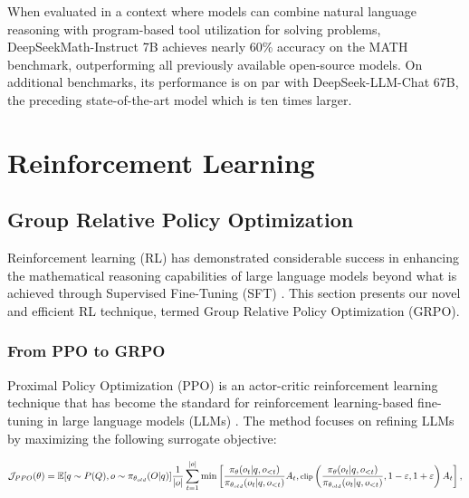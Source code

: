 \begin{itemize}[topsep=0pt]
\begin{itemize}[topsep=0pt]
When evaluated in a context where models can combine natural language reasoning with program-based tool utilization for solving problems, DeepSeekMath-Instruct 7B achieves nearly 60\% accuracy on the MATH benchmark, outperforming all previously available open-source models. On additional benchmarks, its performance is on par with DeepSeek-LLM-Chat 67B, the preceding state-of-the-art model which is ten times larger.

\section{Reinforcement Learning}

\subsection{Group Relative Policy Optimization} Reinforcement learning (RL) has demonstrated considerable success in enhancing the mathematical reasoning capabilities of large language models beyond what is achieved through Supervised Fine-Tuning (SFT) \citep{wang2023math,wizardmath}. This section presents our novel and efficient RL technique, termed Group Relative Policy Optimization (GRPO).

\subsubsection{From PPO to GRPO} Proximal Policy Optimization (PPO) \citep{schulman2017proximal} is an actor-critic reinforcement learning technique that has become the standard for reinforcement learning-based fine-tuning in large language models (LLMs) \citep{ouyang2022training}. The method focuses on refining LLMs by maximizing the following surrogate objective:

\begin{equation}
\footnotesize
    \mathcal{J}_{PPO}(\theta) = \mathbb{E}{[q \sim P(Q), o \sim \pi_{\theta_{old}}(O|q)]} \frac{1}{|o|} \sum_{t=1}^{|o|} \min \left[ \frac{\pi_\theta(o_{t} | q, o_{<t})}{\pi_{\theta_{old}}(o_{t} | q, o_{<t})} A_{t}, \text{clip} \left( \frac{\pi_\theta(o_{t} | q, o_{<t})}{\pi_{\theta_{old}}(o_{t} | q, o_{<t})}, 1 - \varepsilon, 1 + \varepsilon \right)  A_{t} \right] ,
\end{equation}


\end{itemize}
\end{itemize}
